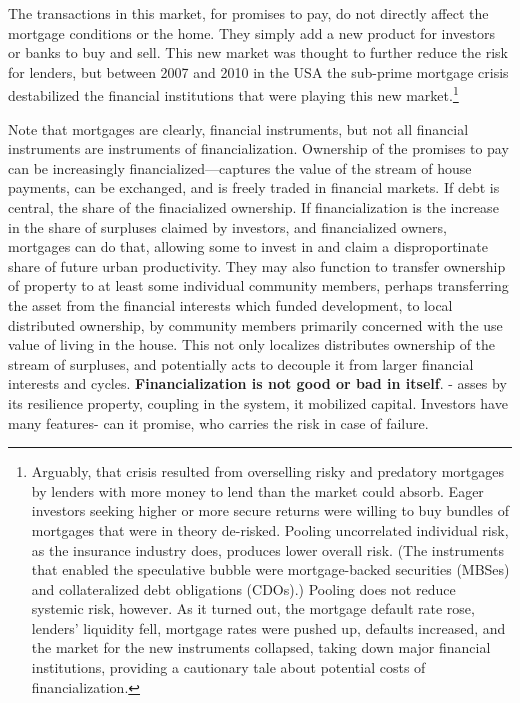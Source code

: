 The transactions in this market, for promises to pay, do not directly affect the mortgage conditions or the home. They simply add a new product for investors or banks to buy and sell. This new market was thought to further reduce the risk for lenders, but between 2007 and 2010 in the USA the sub-prime mortgage crisis destabilized the financial institutions that were playing this new market.\footnote{Arguably, that crisis resulted from overselling risky and predatory mortgages by lenders with more money to lend than the market could absorb. Eager investors seeking higher or more secure returns were willing  to buy bundles of  mortgages that were in theory de-risked. Pooling uncorrelated individual risk, as the insurance industry does, produces lower overall risk. (The instruments that enabled the speculative bubble were mortgage-backed securities (MBSes) and collateralized debt obligations (CDOs).) Pooling does not reduce systemic risk, however. As it turned out, the mortgage default rate rose, lenders' liquidity fell, mortgage rates were pushed up, defaults increased, and the market for the new instruments collapsed, taking down major financial institutions, providing a cautionary tale about potential costs of financialization.} %

Note that mortgages are clearly, financial instruments, but not all financial instruments are instruments of financialization. 
Ownership of the promises to pay can be increasingly financialized---captures the value of the stream of house payments, can be exchanged, and is freely traded in financial markets. If debt is central, the share of the finacialized ownership.
If financialization is the increase in the share of surpluses claimed by investors, and financialized owners, mortgages can do that, allowing some to invest in and claim a disproportinate share of future urban productivity. They may also function to transfer ownership of property to at least some individual community members, perhaps transferring the asset from the financial interests which funded development, to local distributed ownership, by community members primarily concerned with the use value of living in the house. This not only localizes distributes ownership of the stream of surpluses, and potentially acts to decouple it from larger financial interests and cycles. 
\textbf{Financialization is not good or bad in itself}. - asses by its resilience property, coupling in the system, it mobilized capital. Investors have many features- can it promise, who carries the risk in case of failure. 

